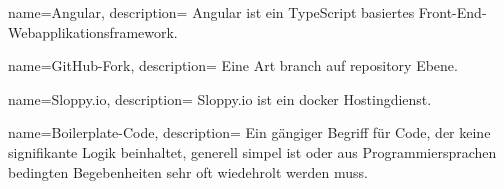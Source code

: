 {
	name=Angular,
	description={
		Angular ist ein TypeScript basiertes Front-End-Webapplikationsframework.
	}
}

{
	name=GitHub-Fork,
	description={
		Eine Art \gls{branch} auf \gls{repository} Ebene.
	}
}

{
	name=Sloppy.io,
	description={
		Sloppy.io ist ein \gls{docker} Hostingdienst.
	}
}

{
	name=Boilerplate-Code,
	description={
		Ein gängiger Begriff für Code, der keine signifikante Logik beinhaltet, generell simpel ist oder aus Programmiersprachen bedingten Begebenheiten sehr oft wiedehrolt werden muss.
	}
}
